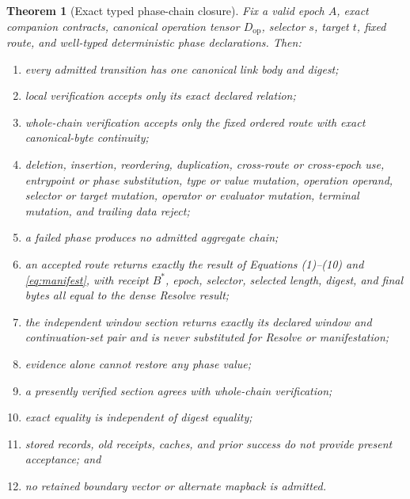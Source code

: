 \documentclass[11pt,letterpaper]{article}
\newtheorem{theorem}{Theorem}
\theoremstyle{definition}
\begin{document}
\begin{theorem}[Exact typed phase-chain closure]
Fix a valid epoch $A$, exact companion contracts, canonical operation tensor
$D_{\mathrm{op}}$, selector $s$, target $t$, fixed route, and well-typed
deterministic phase declarations.  Then:
\begin{enumerate}[label=(\arabic*)]
\item every admitted transition has one canonical link body and digest;
\item local verification accepts only its exact declared relation;
\item whole-chain verification accepts only the fixed ordered route with exact
canonical-byte continuity;
\item deletion, insertion, reordering, duplication, cross-route or cross-epoch
use, entrypoint or phase substitution, type or value mutation, operation
operand, selector or target mutation, operator or evaluator mutation, terminal
mutation, and trailing data reject;
\item a failed phase produces no admitted aggregate chain;
\item an accepted route returns exactly the result of Equations
(1)--(10) and \eqref{eq:manifest}, with receipt $B^*$, epoch, selector,
selected length, digest, and final bytes all equal to the dense Resolve result;
\item the independent window section returns exactly its declared window and
continuation-set pair and is never substituted for Resolve or manifestation;
\item evidence alone cannot restore any phase value;
\item a presently verified section agrees with whole-chain verification;
\item exact equality is independent of digest equality;
\item stored records, old receipts, caches, and prior success do not provide
present acceptance; and
\item no retained boundary vector or alternate mapback is admitted.
\end{enumerate}
\end{theorem}
\end{document}
